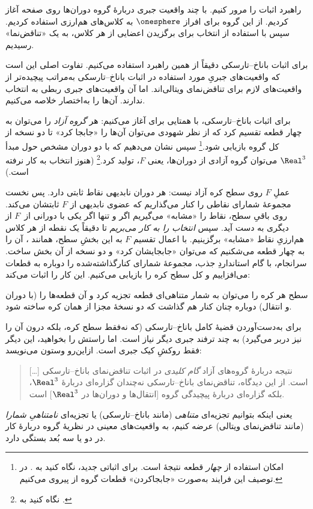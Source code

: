 \documentclass[../../../include/open-logic-section]{subfiles}
\begin{document}
راهبرد اثبات را مرور کنیم. با چند واقعیت جبری دربارهٔ گروه دوران‌ها
روی صفحه آغاز کردیم. از این گروه برای افراز $\onesphere$ به
کلاس‌های هم‌ارزی استفاده کردیم. سپس با استفاده از انتخاب برای
برگزیدن اعضایی از هر کلاس، به یک «تناقض‌نما» رسیدیم.

برای اثبات باناخ--تارسکی دقیقاً از همین راهبرد استفاده می‌کنیم.
تفاوت اصلی این است که واقعیت‌های جبریِ مورد استفاده در اثبات
باناخ--تارسکی به‌مراتب پیچیده‌تر از واقعیت‌های لازم برای
تناقض‌نمای ویتالی‌اند. اما آن واقعیت‌های جبری ربطی به انتخاب ندارند.
آن‌ها را به‌اختصار خلاصه می‌کنیم.

برای اثبات باناخ--تارسکی، با همتایی برای
 آغاز می‌کنیم: هر \emph{گروه آزاد} را می‌توان
به چهار قطعه تقسیم کرد که از نظر شهودی می‌توان آن‌ها را «جابجا کرد»
تا دو نسخه از کل گروه بازیابی شود.\footnote{امکان استفاده از
\emph{چهار} قطعه نتیجهٔ \cite{Robinson1947} است. برای اثباتی جدید،
نگاه کنید به \citet[Theorem 5.2]{Wagon2016}. در توصیف این فرایند
به‌صورت «جابجاکردن» قطعات گروه از
\citet[p.~3]{Weston2003} پیروی می‌کنیم.} سپس نشان می‌دهیم که با دو
دوران مشخص حول مبدأ $\Real^3$ می‌توان گروه آزادی از دوران‌ها، یعنی
$F$، تولید کرد.\footnote{نگاه کنید به
\citet[Theorem 2.1]{Wagon2016}.} (هنوز انتخاب به کار نرفته است.)

عملِ $F$ روی سطح کره آزاد نیست: هر دوران نابدیهی نقاط ثابتی دارد.
پس نخست مجموعهٔ شمارای نقاطی را کنار می‌گذاریم که عضوی نابدیهی از
$F$ ثابتشان می‌کند. روی باقیِ سطح، نقاط را «مشابه» می‌گیریم اگر و
تنها اگر یکی با دورانی از~$F$ از دیگری به دست آید. سپس
\emph{انتخاب را به کار می‌بریم} تا دقیقاً یک نقطه از هر کلاس
هم‌ارزیِ نقاط «مشابه» برگزینیم. با اعمال تقسیم $F$ به این بخشِ سطح،
همانند ، آن را به چهار قطعه می‌شکنیم که
می‌توان «جابجایشان کرد» و دو نسخه از آن بخش ساخت. سرانجام، با گام
استانداردِ جذب، مجموعهٔ شمارای کنارگذاشته‌شده را دوباره به قطعات
می‌افزاییم و کل سطح کره را بازیابی می‌کنیم. این کار
\citep{Hausdorff1914} را اثبات می‌کند:

\begin{thm}
سطح هر کره را می‌توان به شمار متناهی‌ای قطعه تجزیه کرد و آن قطعه‌ها
را (با دوران و انتقال) دوباره چنان کنار هم گذاشت که دو نسخهٔ مجزا
از همان کره ساخته شود.
\end{thm}

برای به‌دست‌آوردن قضیهٔ کامل باناخ--تارسکی (که نه‌فقط سطح کره، بلکه
درون آن را نیز دربر می‌گیرد) به چند ترفند جبری دیگر نیاز است. اما
راستش را بخواهید، این دیگر فقط روکشِ کیک جبری است. ازاین‌رو وستون
می‌نویسد:
\begin{quote}
  [\ldots] نتیجه دربارهٔ گروه‌های آزاد \emph{گام کلیدی} در اثبات
  تناقض‌نمای باناخ--تارسکی است. از این دیدگاه، تناقض‌نمای
  باناخ--تارسکی نه‌چندان گزاره‌ای دربارهٔ $\Real^3$، بلکه گزاره‌ای
  دربارهٔ پیچیدگی گروه [انتقال‌ها و دوران‌ها در $\Real^3$] است.
  \cite[p.~16]{Weston2003}
\end{quote}
یعنی اینکه بتوانیم تجزیه‌ای \emph{متناهی} (مانند باناخ--تارسکی) یا
تجزیه‌ای \emph{نامتناهیِ شمارا} (مانند تناقض‌نمای ویتالی) عرضه کنیم،
به واقعیت‌های معینی در نظریهٔ گروه دربارهٔ کار در دو یا سه بُعد
بستگی دارد.
\end{document}
